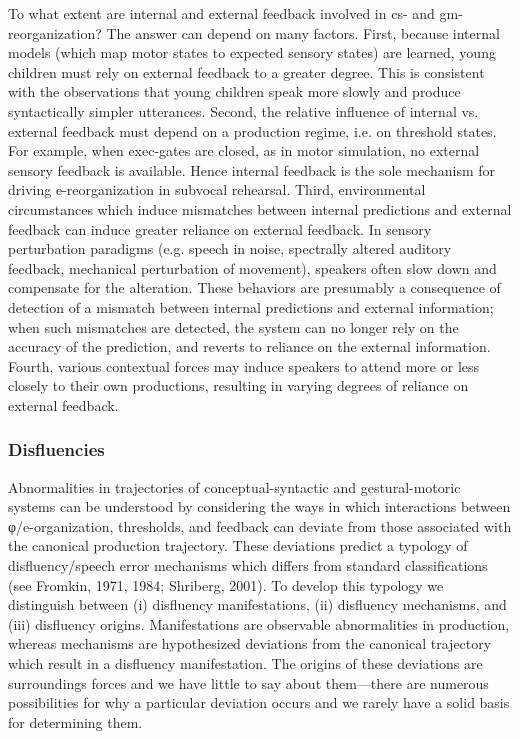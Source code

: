   To what extent are internal and external feedback involved in cs- and gm- reorganization? The answer can depend on many factors. First, because internal models (which map motor states to expected sensory states) are learned, young children must rely on external feedback to a greater degree. This is consistent with the observations that young children speak more slowly and produce syntactically simpler utterances. Second, the relative influence of internal vs. external feedback must depend on a production regime, i.e. on threshold states. For example, when exec-gates are closed, as in motor simulation, no external sensory feedback is available. Hence internal feedback is the sole mechanism for driving e-reorganization in subvocal rehearsal. Third, environmental circumstances which induce mismatches between internal predictions and external feedback can induce greater reliance on external feedback. In sensory perturbation paradigms (e.g. speech in noise, spectrally altered auditory feedback, mechanical perturbation of movement), speakers often slow down and compensate for the alteration. These behaviors are presumably a consequence of detection of a mismatch between internal predictions and external information; when such mismatches are detected, the system can no longer rely on the accuracy of the prediction, and reverts to reliance on the external information. Fourth, various contextual forces may induce speakers to attend more or less closely to their own productions, resulting in varying degrees of reliance on external feedback.

\subsubsection{Disfluencies}

Abnormalities in trajectories of conceptual-syntactic and gestural-motoric systems can be understood by considering the ways in which interactions between φ/e-organization, thresholds, and feedback can deviate from those associated with the canonical production trajectory. These deviations predict a typology of disfluency/speech error mechanisms which differs from standard classifications (see Fromkin, 1971, 1984; Shriberg, 2001). To develop this typology we distinguish between (i) disfluency manifestations, (ii) disfluency mechanisms, and (iii) disfluency origins. Manifestations are observable abnormalities in production, whereas mechanisms are hypothesized deviations from the canonical trajectory which result in a disfluency manifestation. The origins of these deviations are surroundings forces and we have little to say about them—there are numerous possibilities for why a particular deviation occurs and we rarely have a solid basis for determining them. 

